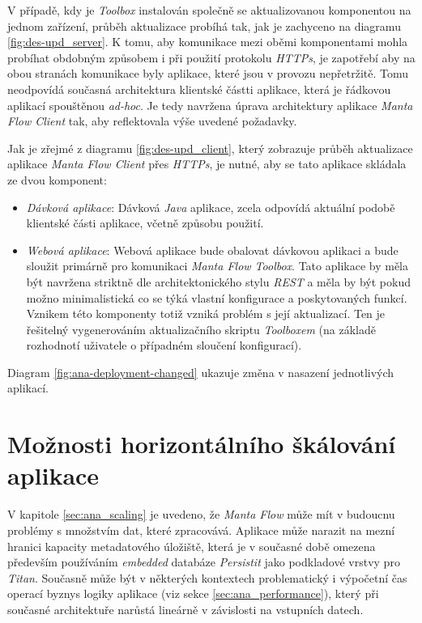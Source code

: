 V případě, kdy je \textit{Toolbox} instalován společně se aktualizovanou komponentou na jednom zařízení, průběh aktualizace probíhá tak, jak je zachyceno na diagramu \ref{fig:des-upd_server}. K tomu, aby komunikace mezi oběmi komponentami mohla probíhat obdobným způsobem i při použití protokolu \textit{HTTPs}, je zapotřebí aby na obou stranách komunikace byly aplikace, které jsou v provozu nepřetržitě. Tomu neodpovídá současná architektura klientské částti aplikace, která je řádkovou aplikací spouštěnou \textit{ad-hoc}. Je tedy navržena úprava architektury aplikace \textit{Manta Flow Client} tak, aby reflektovala výše uvedené požadavky.

Jak je zřejmé z diagramu \ref{fig:des-upd_client}, který zobrazuje průběh aktualizace aplikace \textit{Manta Flow Client} přes \textit{HTTPs}, je nutné, aby se tato aplikace skládala ze dvou komponent:

\begin{itemize}
   \item{\textit{Dávková aplikace}}: Dávková \textit{Java} aplikace, zcela odpovídá aktuální podobě klientské části aplikace, včetně způsobu použití.
   \item{\textit{Webová aplikace}}: Webová aplikace bude obalovat dávkovou aplikaci a bude sloužit primárně pro komunikaci \textit{Manta Flow Toolbox}. Tato aplikace by měla být navržena striktně dle architektonického stylu \textit{REST} a měla by být pokud možno minimalistická co se týká vlastní konfigurace a poskytovaných funkcí. Vznikem této komponenty totiž vzniká problém s její aktualizací. Ten je řešitelný vygenerováním aktualizačního skriptu \textit{Toolboxem} (na základě rozhodnotí uživatele o případném sloučení konfigurací).
\end{itemize}

Diagram \ref{fig:ana-deployment-changed} ukazuje změna v nasazení jednotlivých aplikací.


\section{Možnosti horizontálního škálování aplikace}
\label{sec:des_scaling}
V kapitole \ref{sec:ana_scaling} je uvedeno, že \textit{Manta Flow} může mít v budoucnu problémy s množstvím dat, které zpracovává. Aplikace může narazit na mezní hranici kapacity metadatového úložiště, která je v současné době omezena především používáním \textit{embedded} databáze \textit{Persistit} jako podkladové vrstvy pro \textit{Titan}. Současně může být v některých kontextech problematický i výpočetní čas operací byznys logiky aplikace (viz sekce \ref{sec:ana_performance}), který při současné architektuře narůstá lineárně v závislosti na vstupních datech.

